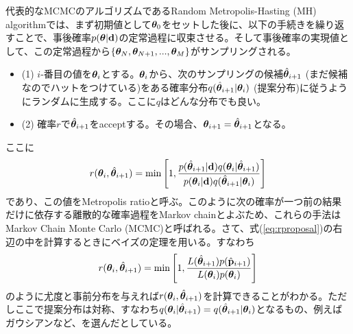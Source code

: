 代表的なMCMCのアルゴリズムであるRandom Metropolis-Hasting (MH) algorithmでは、まず初期値として${\boldsymbol{\theta}}_0$をセットした後に、以下の手続きを繰り返すことで、事後確率$p({\boldsymbol{\theta}}|{\bf d})$の定常過程に収束させる。そして事後確率の実現値として、この定常過程から$\{{\boldsymbol{\theta}}_N,{\boldsymbol{\theta}}_{N+1},..., {\boldsymbol{\theta}}_{M}\}$がサンプリングされる。
\begin{itemize}
 \item (1) $i$-番目の値を${\boldsymbol{\theta}}_i$とする。${\boldsymbol{\theta}}_i$から、次のサンプリングの候補$\hat{\boldsymbol{\theta}}_{i+1}$ (まだ候補なのでハットをつけている)をある確率分布$q(\hat{\boldsymbol{\theta}}_{i+1}|{\boldsymbol{\theta}}_i)$ (提案分布)に従うようにランダムに生成する。ここに$q$はどんな分布でも良い。
 \item (2) 確率$r$で$\hat{\boldsymbol{\theta}}_{i+1}$をacceptする。その場合、${\boldsymbol{\theta}}_{i+1}=\hat{\boldsymbol{\theta}}_{i+1}$となる。
\end{itemize}
ここに
\begin{align}
  \label{eq:rproposal}
r({\boldsymbol{\theta}}_i,\hat{\boldsymbol{\theta}}_{i+1}) = \mathrm{min} \left[1, \frac{p(\hat{\boldsymbol{\theta}}_{i+1}|{\bf d}) q({\boldsymbol{\theta}}_i|\hat{\boldsymbol{\theta}}_{i+1})}{p({\boldsymbol{\theta}}_i|{\bf d}) q(\hat{\boldsymbol{\theta}}_{i+1}|{\boldsymbol{\theta}}_i)} \right]
\end{align}
であり、この値をMetropolis ratioと呼ぶ。このように次の確率が一つ前の結果だけに依存する離散的な確率過程をMarkov chainとよぶため、これらの手法はMarkov Chain Monte Carlo (MCMC)と呼ばれる。さて、式(\ref{eq:rproposal})の右辺の中を計算するときにベイズの定理を用いる。すなわち
\begin{align}
  \label{eq:rpbayes}
r({\boldsymbol{\theta}}_i,\hat{\boldsymbol{\theta}}_{i+1})  = \mathrm{min} \left[1, \frac{L(\hat{\boldsymbol{\theta}}_{i+1}) p(\hat{\bf p }_{i+1})}{L({\boldsymbol{\theta}}_{i}) p({\boldsymbol{\theta}}_{i})} \right]
\end{align}
のように尤度と事前分布を与えれば$r({\boldsymbol{\theta}}_i,\hat{\boldsymbol{\theta}}_{i+1})$を計算できることがわかる。ただしここで提案分布は対称、すなわち$q({\boldsymbol{\theta}}_i|\hat{\boldsymbol{\theta}}_{i+1})= q(\hat{\boldsymbol{\theta}}_{i+1}|{\boldsymbol{\theta}}_i) $となるもの、例えばガウシアンなど、を選んだとしている。

